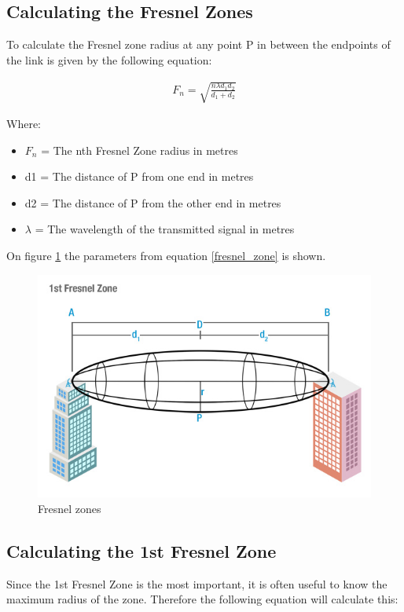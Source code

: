 \subsection{Calculating the Fresnel Zones}
To calculate the Fresnel zone radius at any point P in between the endpoints of the link is given by the following equation: 

\begin{align}
F_n = \sqrt{\frac{n \lambda d_1 d_2}{d_1+d_2}} \label{fresnel_zone}
\end{align}

Where:
\begin{itemize}[label=]
\item $F_n$ = The nth Fresnel Zone radius in metres
\item d1 = The distance of P from one end in metres
\item d2 = The distance of P from the other end in metres
\item $\lambda$ = The wavelength of the transmitted signal in metres
\end{itemize}

\noindent On figure \ref{fig:fresnel_zones} the parameters from equation \ref{fresnel_zone} is shown. 
\begin{figure}[H]
	\centering
	\includegraphics[scale=0.70]{figures/fresnel_zone.jpg}
	\caption{Fresnel zones}
	\label{fig:fresnel_zones}
\end{figure}  

\subsection{Calculating the 1st Fresnel Zone}
Since the 1st Fresnel Zone is the most important, it is often useful to know the maximum radius of the zone. Therefore the following equation will calculate this:

